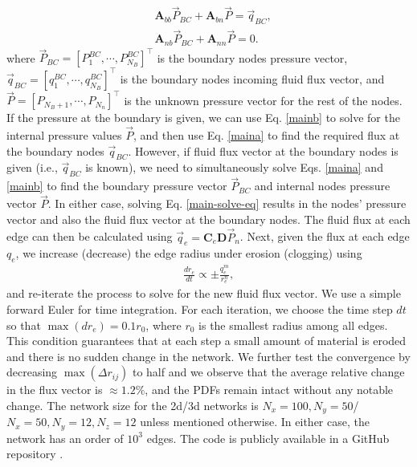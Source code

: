 \documentclass[%
 amsmath,amssymb,
prstper,
]{revtex4-2}
\begin{document}
%
\begin{subequations}\label{main-solve-eq}
\begin{align}
  & \mathbf{A}_{bb} \vec{P}_{BC} + \mathbf{A}_{bn}  \vec{P} = \vec{q}_{BC}, \label{maina} \\
& \mathbf{A}_{nb}\vec{P}_{BC} +  \mathbf{A}_{nn} \vec{P} = 0. \label{mainb}
 \end{align}
\end{subequations}
%
where $\vec{P}_{BC} = [P^{BC}_1, \cdots, P^{BC}_{N_B}]^\top$ is the boundary nodes pressure vector, $\vec{q}_{BC} = [q^{BC}_1, \cdots, q^{BC}_{N_B}]^\top$ is the boundary nodes incoming fluid flux vector, and $\vec{P} = [P_{N_B+1}, \cdots, P_{N_n}]^\top$ is the unknown pressure vector for the rest of the nodes. If the pressure at the boundary is given,  we can use Eq. \eqref{mainb} to solve for the internal pressure values $\vec{P}$, and then use Eq. \eqref{maina} to find the required flux at the boundary nodes $\vec{q}_{BC}$. However, if fluid flux vector at the boundary nodes is given (i.e., $\vec{q}_{BC}$ is known), we need to simultaneously solve  Eqs. \eqref{maina} and \eqref{mainb} to find the boundary pressure vector  $\vec{P}_{BC}$ and internal nodes pressure vector $\vec{P}$. In either case, solving Eq. \eqref{main-solve-eq}  results in the nodes' pressure vector and also the fluid flux vector at the boundary nodes. The fluid flux at each edge can then be calculated using  $\vec{q}_e=\mathbf{C}_e \mathbf{D} \vec{P}_n$. Next, given the flux at each edge  $q_e$, we increase (decrease) the edge radius under erosion (clogging) using 
%
\begin{align}
    \frac{dr_e}{dt} \propto \pm  \frac{q^m_e}{r_e^n},
\end{align}
%
and re-iterate the process to solve for the new fluid flux vector. We use a simple forward Euler for time integration. For each iteration, we choose the time step $dt$ so that $\max(dr_e) = 0.1 r_0$, where $r_0$ is the smallest radius among all edges. 
This condition guarantees that at each step a small amount of material is eroded and there is no sudden change in the network. We further test the convergence by decreasing $\max(\Delta r_{ij})$ to half and we observe that the average relative change in the flux vector is $\approx 1.2\%$, and the PDFs remain intact without any notable change. The network size for the 2d/3d networks is $N_x=100,N_y=50$/$N_x=50,N_y=12, N_z=12$ unless mentioned otherwise. In either case, the network has an order of $10^3$ edges. The code is publicly available in a GitHub repository \cite{githubrepo}. 
\end{document}
